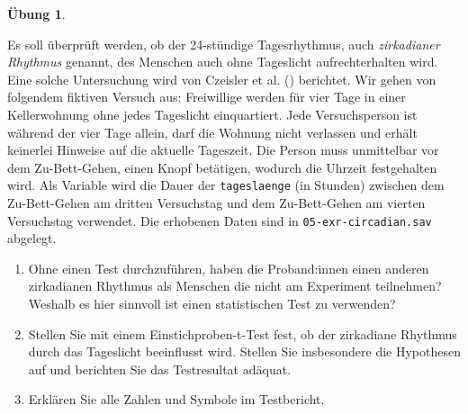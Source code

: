 \documentclass[
]{book}
\providecommand{\tightlist}{%
  \setlength{\itemsep}{0pt}\setlength{\parskip}{0pt}}
\theoremstyle{definition}
\theoremstyle{definition}
\theoremstyle{definition}
\newtheorem{exercise}{Übung}[chapter]
\theoremstyle{definition}
\theoremstyle{remark}
\begin{document}
\begin{exercise}
\protect\hypertarget{exr:circadian}{}\label{exr:circadian}\leavevmode

Es soll überprüft werden, ob der 24-stündige Tagesrhythmus, auch \emph{zirkadianer Rhythmus} genannt, des Menschen auch ohne Tageslicht aufrechterhalten wird. Eine solche Untersuchung wird von Czeisler et al. () berichtet. Wir gehen von folgendem fiktiven Versuch aus: Freiwillige werden für vier Tage in einer Kellerwohnung ohne jedes Tageslicht einquartiert. Jede Versuchsperson ist während der vier Tage allein, darf die Wohnung nicht verlassen und erhält keinerlei Hinweise auf die aktuelle Tageszeit. Die Person muss unmittelbar vor dem Zu-Bett-Gehen, einen Knopf betätigen, wodurch die Uhrzeit festgehalten wird. Als Variable wird die Dauer der \texttt{tageslaenge} (in Stunden) zwischen dem Zu-Bett-Gehen am dritten Versuchstag und dem Zu-Bett-Gehen am vierten Versuchstag verwendet. Die erhobenen Daten sind in \texttt{05-exr-circadian.sav} abgelegt.

\begin{enumerate}
\def\labelenumi{\alph{enumi})}
\tightlist
\item
  Ohne einen Test durchzuführen, haben die Proband:innen einen anderen zirkadianen Rhythmus als Menschen die nicht am Experiment teilnehmen? Weshalb es hier sinnvoll ist einen statistischen Test zu verwenden?
\item
  Stellen Sie mit einem Einstichproben-t-Test fest, ob der zirkadiane Rhythmus durch das Tageslicht beeinflusst wird. Stellen Sie insbesondere die Hypothesen auf und berichten Sie das Testresultat adäquat.
\item
  Erklären Sie alle Zahlen und Symbole im Testbericht.
\end{enumerate}

\end{exercise}
\end{document}
